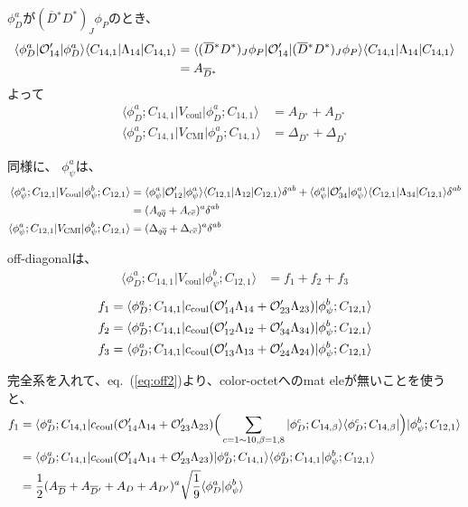 \documentclass[a4j]{jarticle}
\def\bra{\langle}
\def\ket{\rangle}
\def\calO{{\cal O}}
\def\cbar{\overline{{c}}}
\def\qbar{\overline{{q}}}
\def\Dbar{\overline{{D}}{}}
\def\half#1{\text{${#1\over 2}$}}
\def\Vcoul{V_\text{coul}}
\def\Vcmi{V_\text{CMI}}
\begin{document}
$\phi_D^a$が$(\Dbar^* D^*)_J\phi_P$のとき、
\begin{align}
\bra \phi_D^a|\calO'_{14}|\phi_D^a\ket\bra C_{14,1}|\Lambda_{14}|C_{14,1}\ket
&=
\bra (\Dbar^* D^*)_J\phi_P|\calO'_{14}|(\Dbar^* D^*)_J\phi_P\ket\bra C_{14,1}|\Lambda_{14}|C_{14,1}\ket
\\
&=A_{\Dbar^*}
\end{align}
よって
\begin{align}
\bra \phi_D^a;C_{14,1}|\Vcoul|\phi_D^a;C_{14,1}\ket
&=A_{\Dbar^*}+A_{D^*}
\\
\bra \phi_D^a;C_{14,1}|\Vcmi|\phi_D^a;C_{14,1}\ket
&=\Delta_{\Dbar^*}+\Delta_{D^*}
\end{align}

同様に、
$\phi_\psi^a$は、
\begin{align}
\bra \phi_\psi^a;C_{12,1}|\Vcoul|\phi_\psi^b;C_{12,1}\ket
&=\bra \phi_\psi^a|\calO'_{12}|\phi_\psi^a\ket\bra C_{12,1}|\Lambda_{12}|C_{12,1}\ket\delta^{ab}
 +\bra \phi_\psi^a|\calO'_{34}|\phi_\psi^a\ket\bra C_{12,1}|\Lambda_{34}|C_{12,1}\ket\delta^{ab}
\nonumber\\
&=(A_{q\qbar}+A_{c\cbar})^a\delta^{ab}
\\
\bra \phi_\psi^a;C_{12,1}|\Vcmi|\phi_\psi^b;C_{12,1}\ket
&=(\Delta_{q\qbar}+\Delta_{c\cbar})^a\delta^{ab}
\end{align}

off-diagonalは、
\begin{align}
\bra \phi_D^a;C_{14,1}|\Vcoul|\phi_\psi^b;C_{12,1}\ket&=f_1+f_2+f_3
\end{align}
\begin{align}
f_1&=\bra \phi_D^a;C_{14,1}|c_\text{coul}(\calO'_{14}\Lambda_{14}+\calO'_{23}\Lambda_{23})|\phi_\psi^b;C_{12,1}\ket
\\
f_2&=\bra \phi_D^a;C_{14,1}|c_\text{coul}(\calO'_{12}\Lambda_{12}+\calO'_{34}\Lambda_{34})|\phi_\psi^b;C_{12,1}\ket
\\
f_3&=\bra \phi_D^a;C_{14,1}|c_\text{coul}(\calO'_{13}\Lambda_{13}+\calO'_{24}\Lambda_{24})|\phi_\psi^b;C_{12,1}\ket
\end{align}

完全系を入れて、eq.\ (\ref{eq:off2})より、color-octetへのmat eleが無いことを使うと、
\begin{align}
f_1&=\bra \phi_D^a;C_{14,1}|c_\text{coul}(\calO'_{14}\Lambda_{14}+\calO'_{23}\Lambda_{23})
\Big(\sum_{c=1\sim 10,\beta=1,8}    |\phi_D^c;C_{14,\beta}\ket\bra\phi_D^c;C_{14,\beta}|\Big)
|\phi_\psi^b;C_{12,1}\ket
\\
&=\bra \phi_D^a;C_{14,1}|c_\text{coul}(\calO'_{14}\Lambda_{14}+\calO'_{23}\Lambda_{23})
|\phi_D^a;C_{14,1}\ket\bra\phi_D^a;C_{14,1}|\phi_\psi^b;C_{12,1}\ket
\\
&=\half1 (A_{\Dbar}+A_{\Dbar'}+A_D+A_{D'})^a\sqrt{1\over 9}\bra\phi_D^a|\phi_\psi^b\ket 
\end{align}
\end{document}
